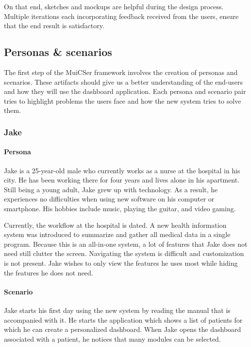         \noindent On that end, sketches and mockups are helpful during the design process. Multiple iterations each incorporating feedback received from the users, ensure that the end result is satisfactory.

    \subsection{Personas \& scenarios}\label{personas_scenarios}

    The first step of the MuiCSer framework involves the creation of personas and scenarios. These artifacts should give us a better understanding of the end-users and how they will use the dashboard application. Each persona and scenario pair tries to highlight problems the users face and how the new system tries to solve them.

        \subsubsection{Jake}

        \paragraph{Persona} Jake is a 25-year-old male who currently works as a nurse at the hospital in his city. He has been working there for four years and lives alone in his apartment. Still being a young adult, Jake grew up with technology. As a result, he experiences no difficulties when using new software on his computer or smartphone. His hobbies include music, playing the guitar, and video gaming.

        Currently, the workflow at the hospital is dated. A new health information system was introduced to summarize and gather all medical data in a single program. Because this is an all-in-one system, a lot of features that Jake does not need still clutter the screen. Navigating the system is difficult and customization is not present. Jake wishes to only view the features he uses most while hiding the features he does not need.
        
        \paragraph{Scenario} Jake starts his first day using the new system by reading the manual that is accompanied with it. He starts the application which shows a list of patients for which he can create a personalized dashboard. When Jake opens the dashboard associated with a patient, he notices that many modules can be selected.

